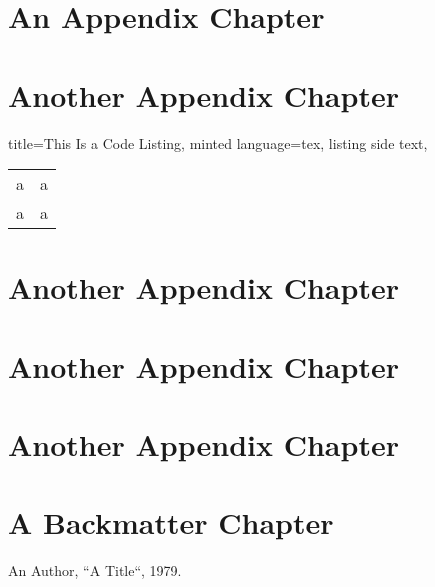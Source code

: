 \documentclass[a4paper,11pt,oneside,showtrims]{alpenthesis}
\begin{document}
\lipsum[2]

\appendix{}
\chapter{An Appendix Chapter}
\lipsum[1-3]

\chapter{Another Appendix Chapter}

\tikzset{external/export next=false}%
\begin{tcblisting}{%
        title=This Is a Code Listing,
        minted language=tex,
        listing side text,
        }
    \begin{tabular}{ll}
        a & a \\
        a & a \\
    \end{tabular}
\end{tcblisting}

\tikzset{external/export next=false}%
\begin{tcolorbox}[title=test]
    \lipsum[2]
\end{tcolorbox}

\tikzset{external/export next=false}%
\begin{tcolorbox}
    \lipsum[2]
\end{tcolorbox}

\chapter{Another Appendix Chapter}
\lipsum[4-6]

\chapter{Another Appendix Chapter}
\lipsum[4-6]

\chapter{Another Appendix Chapter}
\lipsum[4-6]

\backmatter
\chapter{A Backmatter Chapter}
\lipsum[7-9]

\begin{thebibliography}{1}
        An Author, ``A Title``, 1979.
\end{thebibliography}
\end{document}
